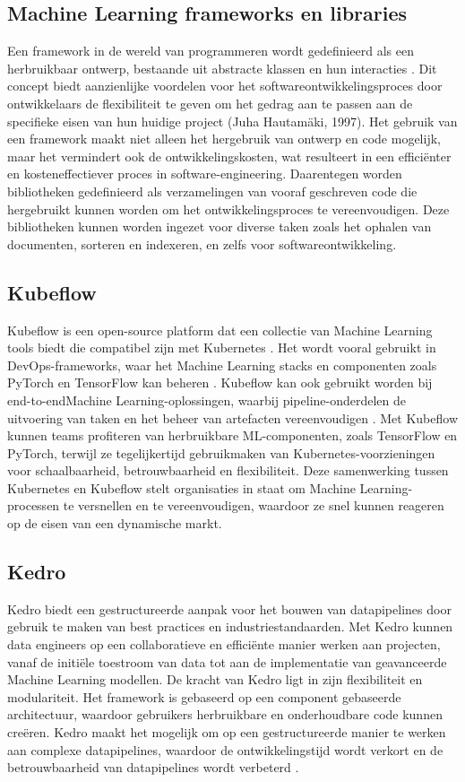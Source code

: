 \subsection{Machine Learning frameworks en libraries}
Een framework in de wereld van programmeren wordt gedefinieerd als een herbruikbaar ontwerp, bestaande uit abstracte klassen en hun interacties \autocite{JuhaHautamaeki1997}. Dit concept biedt aanzienlijke voordelen voor het softwareontwikkelingsproces door ontwikkelaars de flexibiliteit te geven om het gedrag aan te passen aan de specifieke eisen van hun huidige project (Juha Hautamäki, 1997). Het gebruik van een framework maakt niet alleen het hergebruik van ontwerp en code mogelijk, maar het vermindert ook de ontwikkelingskosten, wat resulteert in een efficiënter en kosteneffectiever proces in software-engineering. Daarentegen worden bibliotheken gedefinieerd als verzamelingen van vooraf geschreven code die hergebruikt kunnen worden om het ontwikkelingsproces te vereenvoudigen. Deze bibliotheken kunnen worden ingezet voor diverse taken zoals het ophalen van documenten, sorteren en indexeren, en zelfs voor softwareontwikkeling.
\subsection{Kubeflow}
Kubeflow is een open-source platform dat een collectie van Machine Learning tools biedt die compatibel zijn met Kubernetes \autocite{Kubeflow2021}. Het wordt vooral gebruikt in DevOps-frameworks, waar het Machine Learning stacks en componenten zoals PyTorch en TensorFlow kan beheren \autocite{Chandana2021}.\newline
Kubeflow kan ook gebruikt worden bij end-to-end\newline Machine Learning-oplossingen, waarbij pipeline-onderdelen de uitvoering van taken en het beheer van artefacten vereenvoudigen \autocite{Bisong2019}.
Met Kubeflow kunnen teams profiteren van herbruikbare ML-componenten, zoals TensorFlow en PyTorch, terwijl ze tegelijkertijd gebruikmaken van Kubernetes-voorzieningen voor schaalbaarheid, betrouwbaarheid en flexibiliteit. Deze samenwerking tussen Kubernetes en Kubeflow stelt organisaties in staat om Machine Learning-processen te versnellen en te vereenvoudigen, waardoor ze snel kunnen reageren op de eisen van een dynamische markt.
\subsection{Kedro}
Kedro biedt een gestructureerde aanpak voor het bouwen van datapipelines door gebruik te maken van best practices en industriestandaarden. Met Kedro kunnen data engineers op een collaboratieve en efficiënte manier werken aan projecten, vanaf de initiële toestroom van data tot aan de implementatie van geavanceerde Machine Learning modellen.
De kracht van Kedro ligt in zijn flexibiliteit en modulariteit. Het framework is gebaseerd op een component gebaseerde architectuur, waardoor gebruikers herbruikbare en onderhoudbare code kunnen creëren. Kedro maakt het mogelijk om op een gestructureerde manier te werken aan complexe datapipelines, waardoor de ontwikkelingstijd wordt verkort en de betrouwbaarheid van datapipelines wordt verbeterd \autocite{Kedro2024}.
